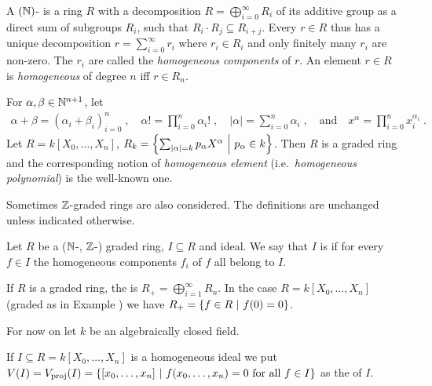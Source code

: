 \documentclass[a4paper,parskip=half,numbers=enddot, DIV=12, headheight=30pt]{scrreprt}
\begin{document}
\begin{defi}
    A $(\mathbb{N})$- is a ring $R$ with a decomposition $R = \bigoplus_{i=0}^\infty R_i$ of its additive group as a direct sum of subgroups $R_i$, such that $R_i\cdot R_j \subseteq R_{i+j}$. Every $r\in R$ thus has a unique decomposition $r=\sum_{i=0}^\infty r_i$ where $r_i\in R_i$ and only finitely many $r_i$ are non-zero.  The $r_i$ are called the \emph{homogeneous components} of $r$. An element $r\in R$ is \emph{homogeneous} of degree $n$ iff $r\in R_n$.
\end{defi}
\begin{example}
    For $\alpha, \beta\in \mathbb{N}^{n+1}$, let 
    \begin{align*}
        \alpha+\beta = (\alpha_i+\beta_i)_{i=0}^n\;,\quad
        \alpha! = \prod_{i=0}^n \alpha_i!\;,\quad
        |\alpha| = \sum_{i=0}^n \alpha_i\;,\quad\text{and}\quad
        x^\alpha = \prod_{i=0}^n x_i^{\alpha_i}\;. 
    \end{align*}
    Let $R=k[X_0,\ldots, X_n]$, $R_k = \left\{\sum_{|\alpha| = k} p_\alpha X^\alpha\ \middle|\  p_\alpha \in k\right\}$. Then $R$ is a graded ring and the corresponding notion of \emph{homogeneous element} (i.e.\ \emph{homogeneous polynomial}) is the well-known one.
\end{example}
\begin{rem*}
    Sometimes $\mathbb{Z}$-graded rings are also considered. The definitions are unchanged unless indicated otherwise.
\end{rem*}
\begin{defi}
    Let $R$ be a ($\mathbb{N}$-, $\mathbb{Z}$-) graded ring, $I\subseteq R$ and ideal. We say that $I$ is  if for every $f\in I$ the homogeneous components $f_i$ of $f$ all belong to $I$.
\end{defi}
\begin{example}
    If $R$ is a graded ring, the  is $R_+= \bigoplus_{i=1}^\infty R_n$. In the case $R=k[X_0, \ldots, X_n]$ (graded as in Example ) we have $R_+= \left\{f\in R\ \middle|\  f(0) = 0\right\}$.
\end{example}
For now on let $k$ be an algebraically closed field.
\def\proj{{\mathrm{proj}}}
\def\aff{{\mathrm{aff}}}
\begin{defi} 
    If $I\subseteq R= k[X_0,\ldots, X_n]$ is a homogeneous ideal we put $V(I) = V_\proj (I) = \left\{[x_0,\ldots, x_n]\st f(x_0,\ldots, x_n) = 0 \text{ for all } f\in I\right\}$ as the  of $I$.
\end{defi}
\end{document}
